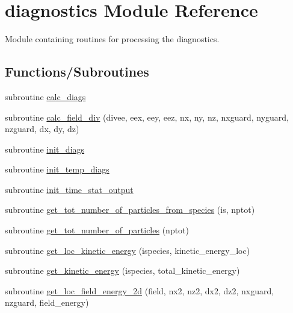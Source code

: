 \hypertarget{namespacediagnostics}{}\section{diagnostics Module Reference}
\label{namespacediagnostics}


Module containing routines for processing the diagnostics.  


\subsection*{Functions/\+Subroutines}
\begin{DoxyCompactItemize}
\item 
subroutine \hyperlink{namespacediagnostics_ae7171376e1d30d3465491f0f75a39180}{calc\+\_\+diags}
\item 
subroutine \hyperlink{namespacediagnostics_a28ade3a7daafd373b08dd7742315ed98}{calc\+\_\+field\+\_\+div} (divee, eex, eey, eez, nx, ny, nz, nxguard, nyguard, nzguard, dx, dy, dz)
\item 
subroutine \hyperlink{namespacediagnostics_a090bf3606a7c0c889195bd01b10adc5c}{init\+\_\+diags}
\item 
subroutine \hyperlink{namespacediagnostics_a111912cfff0906f9e78449119c1a3e43}{init\+\_\+temp\+\_\+diags}
\item 
subroutine \hyperlink{namespacediagnostics_a3ccd1d3efa537c9c73cbca0141184c32}{init\+\_\+time\+\_\+stat\+\_\+output}
\item 
subroutine \hyperlink{namespacediagnostics_a00e54b5beba626e955d8e3e946962f1d}{get\+\_\+tot\+\_\+number\+\_\+of\+\_\+particles\+\_\+from\+\_\+species} (is, nptot)
\item 
subroutine \hyperlink{namespacediagnostics_ab628191e427157162f167691267d0d1f}{get\+\_\+tot\+\_\+number\+\_\+of\+\_\+particles} (nptot)
\item 
subroutine \hyperlink{namespacediagnostics_addf30cc7cc0a935993be10cbf8b017f5}{get\+\_\+loc\+\_\+kinetic\+\_\+energy} (ispecies, kinetic\+\_\+energy\+\_\+loc)
\item 
subroutine \hyperlink{namespacediagnostics_ab51517b8d0751b8e43e0ab3c9338af41}{get\+\_\+kinetic\+\_\+energy} (ispecies, total\+\_\+kinetic\+\_\+energy)
\item 
subroutine \hyperlink{namespacediagnostics_a26be0942bfb3d70876815b6e121dec1c}{get\+\_\+loc\+\_\+field\+\_\+energy\+\_\+2d} (field, nx2, nz2, dx2, dz2, nxguard, nzguard, field\+\_\+energy)
\item 

\end{DoxyCompactItemize}
